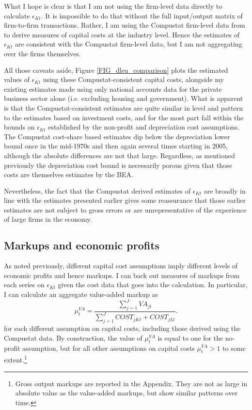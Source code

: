 \documentclass[11pt]{article}
\begin{document}
What I hope is clear is that I am not using the firm-level data directly to calculate $\epsilon_{Kt}$. It is impossible to do that without the full input/output matrix of firm-to-firm transactions. Rather, I am using the Compustat firm-level data from \cite{dleu2020} to derive measures of capital costs at the industry level. Hence the estimates of $\epsilon_{Kt}$ are consistent with the Compustat firm-level data, but I am not aggregating over the firms themselves. 

All those caveats aside, Figure \ref{FIG_dleu_comparison} plots the estimated values of $\epsilon_{Kt}$ using these Compustat-consistent capital costs, alongside my existing estimates made using only national accounts data for the private business sector alone (i.e. excluding housing and government). What is apparent is that the Compustat-consistent estimates are quite similar in level and pattern to the estimates based on investment costs, and for the most part fall within the bounds on $\epsilon_{Kt}$ established by the non-profit and depreciation cost assumptions. The Compustat cost-share based estimates dip below the depreciation lower bound once in the mid-1970s and then again several times starting in 2005, although the absolute differences are not that large. Regardless, as mentioned previously the depreciation cost bound is necessarily porous given that those costs are themselves estimates by the BEA.

Nevertheless, the fact that the Compustat derived estimates of $\epsilon_{Kt}$ are broadly in line with the estimates presented earlier gives some reassurance that those earlier estimates are not subject to gross errors or are unrepresentative of the experience of large firms in the economy.

\subsection{Markups and economic profits}
As noted previously, different capital cost assumptions imply different levels of economic profits and hence markups. I can back out measures of markups from each series on $\epsilon_{Kt}$ given the cost data that goes into the calculation. In particular, I can calculate an aggregate value-added markup as
\begin{equation}
    \mu^{VA}_{t} = \frac{\sum_{j=1}^{J} VA_{jt}}{\sum_{j=1}^J COST_{jKt} + COST_{jLt}}. \label{EQ_markup}
\end{equation}
for each different assumption on capital costs, including those derived using the Compustat data. By construction, the value of $\mu^{VA}_{t}$ is equal to one for the no-profit assumption, but for all other assumptions on capital costs $\mu^{VA}_{t}>1$ to some extent.\footnote{Gross output markups are reported in the Appendix. They are not as large in absolute value as the value-added markups, but show similar patterns over time.} 
\end{document}
